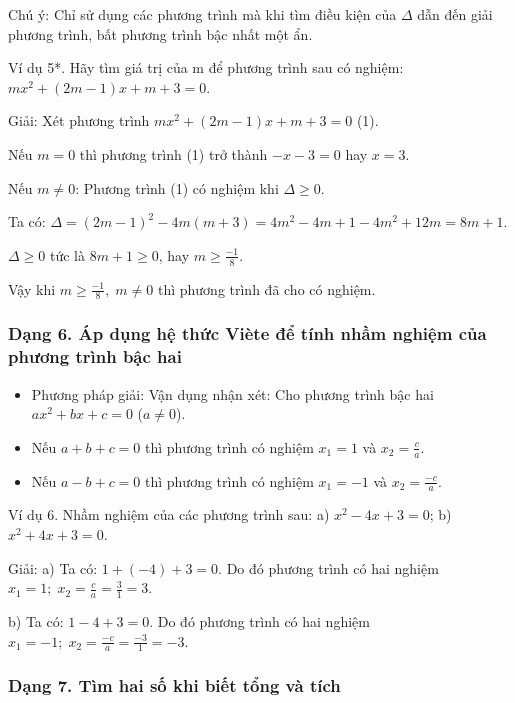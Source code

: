 \documentclass[%
    fontsize=12pt,%
    chapterprefix=false,%
    open=right,%
    twoside=false,%
    numbers=noenddot,%
    headings=optiontohead,%
    final,%
    DIV=15,%
    parskip=half %
]{scrbook}
\begin{document}
Chú ý: Chỉ sử dụng các phương trình mà khi tìm điều kiện của $ \Delta $ dẫn đến giải phương trình, bất phương trình bậc nhất một ẩn.

Ví dụ 5*. Hãy tìm giá trị của m để phương trình sau có nghiệm: $ mx^2 + (2m - 1)x + m + 3 = 0 $.

Giải: Xét phương trình $ mx^2 + (2m - 1)x + m + 3 = 0 $ (1).

Nếu $ m = 0 $ thì phương trình (1) trở thành $ -x - 3 = 0 $ hay $ x = 3 $.

Nếu $ m \neq 0 $: Phương trình (1) có nghiệm khi $ \Delta \geq 0 $.

Ta có: $ \Delta = (2m - 1)^2 - 4m(m + 3) = 4m^2 - 4m + 1 - 4m^2 + 12m = 8m + 1 $.

$ \Delta \geq 0 $ tức là $ 8m + 1 \geq 0 $, hay $ m \geq \frac{-1}{8} $.

Vậy khi $ m \geq \frac{-1}{8}, \; m \neq 0 $ thì phương trình đã cho có nghiệm.
\subsubsection{Dạng 6. Áp dụng hệ thức Viète để tính nhầm nghiệm của phương trình bậc hai}

\begin{itemize}
  \item Phương pháp giải: Vận dụng nhận xét: Cho phương trình bậc hai $ ax^2 + bx + c = 0 $ ($ a \neq 0 $).
\end{itemize}

\begin{itemize}
  \item Nếu $ a + b + c = 0 $ thì phương trình có nghiệm $ x_1 = 1 $ và $ x_2 = \frac{c}{a} $.
\end{itemize}

\begin{itemize}
  \item Nếu $ a - b + c = 0 $ thì phương trình có nghiệm $ x_1 = -1 $ và $ x_2 = \frac{-c}{a} $.
\end{itemize}

Ví dụ 6. Nhầm nghiệm của các phương trình sau: a) $ x^2 - 4x + 3 = 0 $;        b) $ x^2 + 4x + 3 = 0 $.

Giải: a) Ta có: $ 1 + (-4) + 3 = 0 $. Do đó phương trình có hai nghiệm $ x_1 = 1; \; x_2 = \frac{c}{a} = \frac{3}{1} = 3 $.

b) Ta có: $ 1 - 4 + 3 = 0 $. Do đó phương trình có hai nghiệm $ x_1 = -1; \; x_2 = \frac{-c}{a} = \frac{-3}{1} = -3 $.
\subsubsection{Dạng 7. Tìm hai số khi biết tổng và tích}
\end{document}
